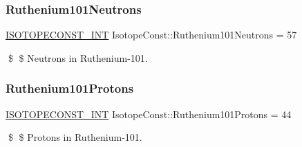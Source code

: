 \subsubsection{\texorpdfstring{Ruthenium101\+Neutrons}{Ruthenium101Neutrons}}
{\footnotesize\ttfamily \mbox{\hyperlink{group___isotope_const-_macros_ga5f18360b3e99483a35c32d789e62621c}{I\+S\+O\+T\+O\+P\+E\+C\+O\+N\+S\+T\+\_\+\+I\+NT}} Isotope\+Const\+::\+Ruthenium101\+Neutrons = 57}

\$ \$ Neutrons in Ruthenium-\/101. \mbox{\label{group___isotope_const-_ruthenium-_ru101_ga54cae460445a08f58f4e839ceb599c34}} 
\subsubsection{\texorpdfstring{Ruthenium101\+Protons}{Ruthenium101Protons}}
{\footnotesize\ttfamily \mbox{\hyperlink{group___isotope_const-_macros_ga5f18360b3e99483a35c32d789e62621c}{I\+S\+O\+T\+O\+P\+E\+C\+O\+N\+S\+T\+\_\+\+I\+NT}} Isotope\+Const\+::\+Ruthenium101\+Protons = 44}

\$ \$ Protons in Ruthenium-\/101. 